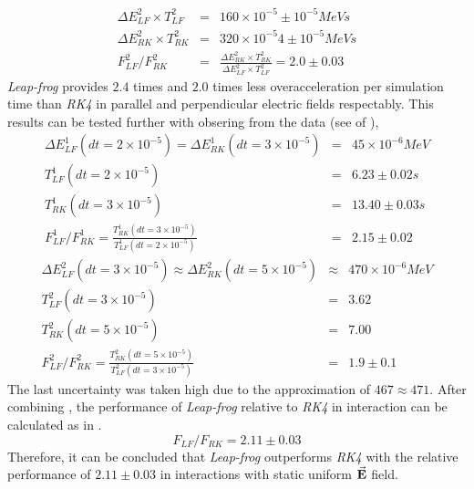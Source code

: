 \documentclass[a4paper,oneside,12pt]{report}
\numberwithin{equation}{chapter}
\begin{document}
\begin{eqnarray} \label{eq:f_lf_rk_2}
    \Delta E_{LF}^2 \times T_{LF}^2 &=& 160 \times 10^{-5} \pm 10^{-5} MeV s \nonumber\\ %
    \Delta E_{RK}^2 \times T_{RK}^2 &=& 320 \times 10^{-5} 4 \pm 10^{-5} MeV s \nonumber\\ %
    F_{LF}^2/F_{RK}^2 &=& \frac{\Delta E_{RK}^2 \times T_{RK}^2 }{\Delta E_{LF}^2 \times T_{LF}^2} = 2.0  \pm 0.03
\end{eqnarray}
\textit{Leap-frog} provides $2.4$ times and $2.0$ times less overacceleration per simulation time than \textit{RK4} in parallel and perpendicular electric fields respectably.
This results can be tested further with obsering from the data (see  of ),
\begin{eqnarray} \label{eq:f_lf_rk_3}
    \Delta E_{LF}^1 (dt=2 \times 10^{-5}) = \Delta E_{RK}^1 (dt=3 \times 10^{-5}) &=& 45 \times 10^{-6} MeV \nonumber\\
    T_{LF}^1(dt=2 \times 10^{-5})  &=& 6.23 \pm 0.02 s \nonumber\\ %
    T_{RK}^1(dt=3 \times 10^{-5})  &=& 13.40 \pm 0.03 s \nonumber\\ %
    F_{LF}^1/F_{RK}^1 = \frac{T_{RK}^1(dt=3 \times 10^{-5})}{T_{LF}^1(dt=2 \times 10^{-5})} &=& 2.15 \pm 0.02
\end{eqnarray}
\begin{eqnarray} \label{eq:f_lf_rk_4}
    \Delta E_{LF}^2 (dt=3 \times 10^{-5}) \approx \Delta E_{RK}^2 (dt=5 \times 10^{-5}) &\approx& 470 \times 10^{-6} MeV \nonumber\\
    T_{LF}^2(dt=3 \times 10^{-5})  &=& 3.62 \nonumber\\ %
    T_{RK}^2(dt=5 \times 10^{-5})  &=& 7.00 \nonumber\\ %
    F_{LF}^2/F_{RK}^2 = \frac{T_{RK}^2(dt=5 \times 10^{-5})}{T_{LF}^2(dt=3 \times 10^{-5})} &=& 1.9 \pm 0.1
\end{eqnarray}
The last uncertainty was taken high due to the approximation of $467 \approx 471$. After combining ,
the performance of \textit{Leap-frog} relative to \textit{RK4} in \eE interaction can be calculated as in .
\begin{equation}\label{eq:lf_rk_eE_relative_performance}
    F_{LF}/F_{RK} = 2.11 \pm 0.03
\end{equation}
Therefore, it can be concluded that \textit{Leap-frog} outperforms \textit{RK4} with the relative performance of $2.11 \pm 0.03$ in \eE interactions with static uniform $\vec{\textbf{E}}$ field. 
\end{document}
